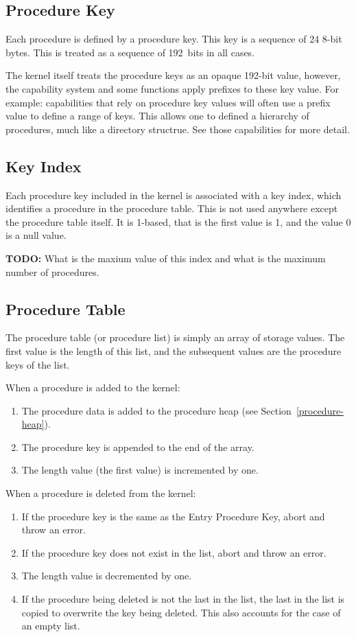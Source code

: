 \documentclass[english,a4paper]{article}
\begin{document}
\subsection{Procedure Key}
Each procedure is defined by a procedure key. This key is a sequence of 24 8-bit
bytes. This is treated as a sequence of 192~bits in all cases.

The kernel itself treats the procedure keys as an opaque 192-bit value, however,
the capability system and some functions apply prefixes to these key value. For
example: capabilities that rely on procedure key values will often use a prefix
value to define a range of keys. This allows one to defined a hierarchy of
procedures, much like a directory structrue. See those capabilities for more
detail.

\subsection{Key Index}
Each procedure key included in the kernel is associated with a key index, which
identifies a procedure in the procedure table. This is not used anywhere except
the procedure table itself. It is 1-based, that is the first value is 1, and the
value 0 is a null value.

\textbf{TODO:} What is the maxium value of this index and what is the maximum
number of procedures.

\subsection{Procedure Table}\label{procedure-table}
The procedure table (or procedure list) is simply an array of storage values.
The first value is the length of this list, and the subsequent values are the
procedure keys of the list.

When a procedure is added to the kernel:

\begin{enumerate}
  \item The procedure data is added to the procedure heap (see
  Section~\ref{procedure-heap}).
  \item The procedure key is appended to the end of the array.
  \item The length value (the first value) is incremented by one.
\end{enumerate}

When a procedure is deleted from the kernel:

\begin{enumerate}
  \item If the procedure key is the same as the Entry Procedure Key, abort and
  throw an error.
  \item If the procedure key does not exist in the list, abort and throw an
  error.
  \item The length value is decremented by one.
  \item If the procedure being deleted is not the last in the list, the last in
  the list is copied to overwrite the key being deleted. This also accounts for
  the case of an empty list.
\end{enumerate}
\end{document}
